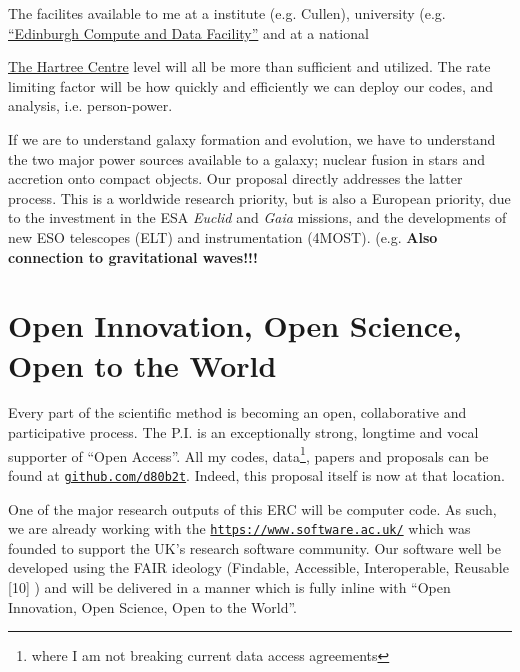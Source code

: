 \documentclass[oneside, a4paper, onecolumn, 11pt]{article}
\begin{document}
\smallskip
\smallskip
\noindent
The facilites available to me at a institute (e.g. Cullen), university
(e.g. \href{https://www.ed.ac.uk/information-services/research-support/research-computing/ecdf}{``Edinburgh
Compute and Data Facility''} and at a national
{\href{https://www.hartree.stfc.ac.uk/Pages/home.aspx}{The Hartree Centre} level will all be more than sufficient and utilized.
The rate limiting factor will be how quickly and efficiently we can deploy our codes, 
and analysis, i.e. person-power. 


\smallskip
\smallskip
\noindent
If we are to understand galaxy formation and evolution, we have to
understand the two major power sources available to a galaxy; nuclear
fusion in stars and accretion onto compact objects. Our proposal
directly addresses the latter process. This is a worldwide research
priority, but is also a European priority, due to the investment in
the ESA {\it Euclid} and {\it Gaia} missions, and the developments of
new ESO telescopes (ELT) and instrumentation (4MOST).  (e.g.
{\bf Also connection to gravitational waves!!!} 


\section*{\textcolor{Cerulean}{Open Innovation, Open Science, Open to the World}}
Every part of the scientific method is becoming an open, collaborative and participative process. 
The P.I. is an exceptionally strong, longtime and vocal supporter of ``Open Access''. 
All my codes, data\footnote{where I am not breaking current data access agreements}, papers 
and proposals can be found at \href{github.com/d80b2t}{{\tt github.com/d80b2t}}. 
Indeed, this proposal itself is now at that location. 

One of the major research outputs 
of this ERC will be computer code. 
As such, we are already working with the
\href{The Software Sustainability Institute}{\tt https://www.software.ac.uk/}
which was founded to support the UK’s research software community. 
Our software well be developed using the FAIR ideology (Findable, Accessible, Interoperable, Reusable
[10]
) 
and will be delivered in a manner which is fully inline 
with ``Open Innovation, Open Science, Open to the World''. 





}
\end{document}
